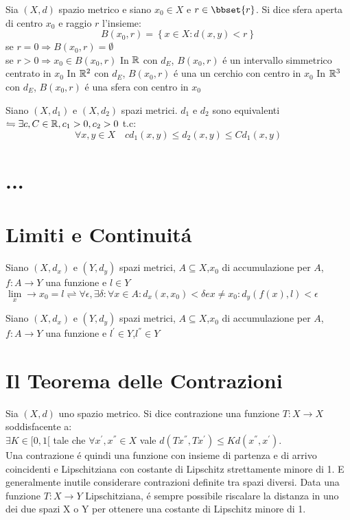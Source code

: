 Sia $(X,d)$ spazio metrico e siano $x_0\in X$ e $r\in\bbset{r}$. Si dice sfera aperta di centro $x_0$ e raggio $r$ l'insieme:
$$B(x_0,r)=\left\{ x\in X : d(x,y)<r  \right\}$$
\observation
se $r=0\Rightarrow B(x_0,r)=\emptyset$\\
se $r>0\Rightarrow x_0\in B(x_0,r)$
\example
In $\mathbb{R}$ con $d_E$, $B(x_0,r)$ \'e un intervallo simmetrico centrato in $x_0$
\example
In $\mathbb{R}^{2}$ con $d_E$, $B(x_0,r)$ \'e una un cerchio con centro in $x_0$
\example
In $\mathbb{R}^{3}$ con $d_E$, $B(x_0,r)$ \'e una sfera con centro in $x_0$
\example
\example

Siano $(X,d_1)$ e $(X,d_2)$ spazi metrici. $d_1$ e $d_2$ sono equivalenti $\leftrightharpoons \exists c,C\in\mathbb{R}, c_1>0, c_2>0$ t.c:
$$ \forall x,y \in X\quad cd_1(x,y)\le d_2(x,y)\le Cd_1(x,y) $$


\section{...}
\section{Limiti e Continuit\'a}
Siano $(X,d_x)$ e $(Y,d_y)$ spazi metrici, $A\subseteq{X}$,$x_0$ di accumulazione per $A$, $f:A\rightarrow{Y}$ una funzione e $l\in{Y}$ \\
$\lim\limits_x\rightarrow{x_0} = l \rightleftharpoons \forall{\epsilon},\exists\delta : \forall{x}\in A : d_x(x,x_0)<\delta e x\ne{x_0} : d_y(f(x),l)<\epsilon$

\proposition
Siano $(X,d_x)$ e $(Y,d_y)$ spazi metrici, $A\subseteq{X}$,$x_0$ di accumulazione per $A$, $f:A\rightarrow{Y}$ una funzione e $l^{'}\in{Y}$,$l^{''}\in{Y}$  \\

\section{Il Teorema delle Contrazioni}
Sia $(X, d)$ uno spazio metrico. Si dice contrazione una funzione
$T: X \rightarrow X$ soddisfacente a:\\

$\exists K \in [0, 1[ $ tale che $\forall x^{'},x^{''}\in X$ vale
$d(Tx^{''}, T x^{'})\le Kd(x^{''}, x^{'}).$\\


Una contrazione \'e quindi una funzione con insieme di partenza e di arrivo coincidenti e
Lipschitziana con costante di Lipschitz strettamente minore di 1.
E generalmente inutile considerare contrazioni definite tra spazi diversi. Data una funzione
$T: X\rightarrow Y$ Lipschitziana, \'e sempre possibile riscalare la distanza in uno dei due spazi X o Y
per ottenere una costante di Lipschitz minore di 1.


